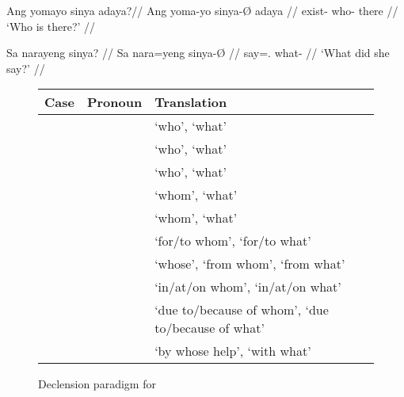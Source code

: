 \pex
\a\begingl
	\gla Ang yomayo sinya adaya?\footnotemark //
	\glb Ang yoma-yo sinya-Ø adaya //
	\glc \AgtT{} exist-\TsgN{} who-\Top{} there //
	\glft `Who is there?' //
\endgl

\a\begingl
	\gla Sa narayeng sinya? //
	\glb Sa nara=yeng sinya-Ø //
	\glc \PatT{} say=\TsgF{}.\Aarg{} what-\Top{} //
	\glft `What did she say?' //
\endgl

\xe


\begin{figure}[tp]\centering
\caption{Declension paradigm for }
\begin{tabu} to \linewidth {X[1] X[3] X[8]}
\tableheaderfont\toprule
Case
	& Pronoun
	& Translation
	\\

\toprule

\Top{}
	& 
	& `who', `what'
	\\

\midrule

\Aarg{}
	& 
	& `who', `what'
	\\

\AargI{}
	& 
	& `who', `what'
	\\
\Parg{}
	& 
	& `whom', `what'
	\\
\PargI{}
	& 
	& `whom', `what'
	\\
\Dat{}
	& 
	& `for/to whom', `for/to what'
	\\

\midrule

\Gen{}
	& 
	& `whose', `from whom', `from what'
	\\

\Loc{}
	& 
	& `in/at/on whom', `in/at/on what'
	\\

\Caus{}
	& 
	& `due to/because of whom', `due to/because of what'
	\\

\Ins{}
	& 
	& `by whose help', `with what'
	\\

\bottomrule
\end{tabu}
\label{fig:sinya}
\end{figure}


